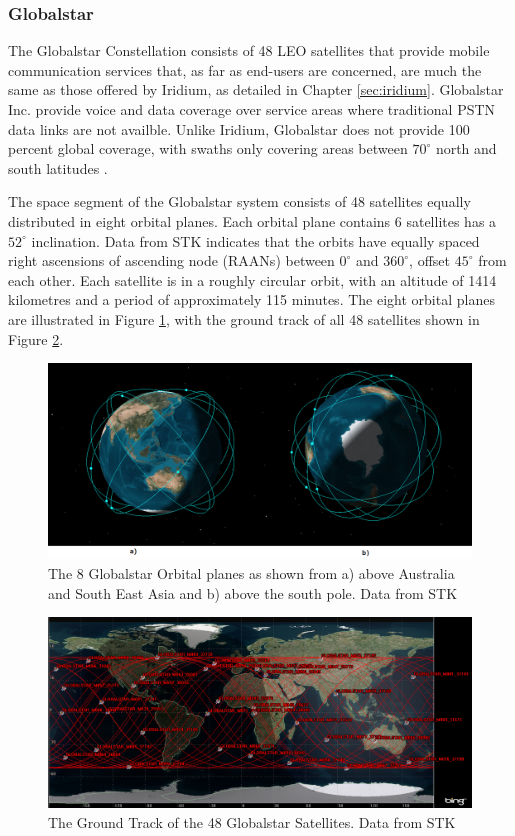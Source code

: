 \subsubsection{Globalstar}
The Globalstar Constellation consists of 48 LEO satellites that provide mobile communication services that, as far as end-users are concerned, are much the same as those offered by Iridium, as detailed in Chapter \ref{sec:iridium}. Globalstar Inc. provide voice and data coverage over service areas where traditional PSTN data links are not availble. Unlike Iridium, Globalstar does not provide 100 percent global coverage, with swaths only covering areas between $70^\circ$ north and south latitudes \cite{Dietrich1998}.

The space segment of the Globalstar system consists of 48 satellites equally distributed in eight orbital planes. Each orbital plane contains 6 satellites has a $52^\circ$ inclination\cite{Smith1996, Dietrich1998}. Data from STK indicates that the orbits have equally spaced right ascensions of ascending node (RAANs) between $0^\circ$ and $360^ \circ$, offset $45^\circ$ from each other. Each satellite is in a roughly circular orbit, with an altitude of 1414 kilometres \cite{Smith1996} and a period of approximately 115 minutes. The eight orbital planes are illustrated in Figure \ref{fig:globalstar_stk}, with the ground track of all 48 satellites shown in Figure \ref{fig:globalstar_2d_stk}.
\begin{figure}[H]
	\centering
	\includegraphics[scale = 0.40]{Pictures/globalstar_stk.png}
	
	\caption{The 8 Globalstar Orbital planes as shown from a) above Australia and South East Asia and b) above the south pole. Data from STK}
	\label{fig:globalstar_stk}
\end{figure}

\begin{figure}[H]
	\centering
	\includegraphics[scale = 0.40]{Pictures/globalstar_2d_stk.png}
	
	\caption{The Ground Track of the 48 Globalstar Satellites. Data from STK}
	\label{fig:globalstar_2d_stk}
\end{figure}

